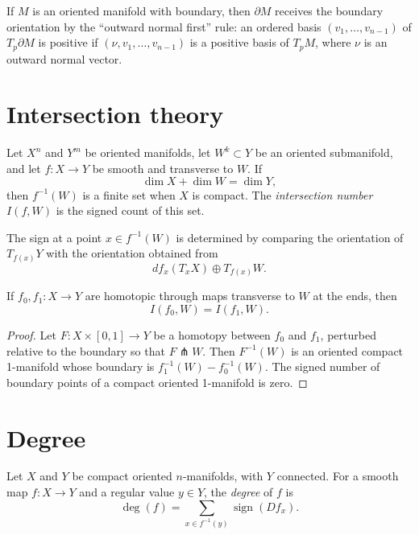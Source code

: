 \noindent
If $M$ is an oriented manifold with boundary,
then $\partial M$ receives the boundary
orientation by the ``outward normal first''
rule: an ordered basis $(v_1,\ldots,v_{n-1})$
of $T_p\partial M$ is positive if
$(\nu,v_1,\ldots,v_{n-1})$ is a positive
basis of $T_pM$, where $\nu$ is an outward
normal vector.

\section{Intersection theory}
\label{section-intersection-theory}

\begin{definition}
\label{definition-intersection-number}
Let $X^n$ and $Y^m$ be oriented manifolds,
let $W^k\subset Y$ be an oriented
submanifold, and let $f:X\to Y$ be smooth and
transverse to $W$.  If
$$
\dim X+\dim W=\dim Y,
$$
then $f^{-1}(W)$ is a finite set when $X$ is
compact.  The {\it intersection number}
$I(f,W)$ is the signed count of this set.
\end{definition}

\noindent
The sign at a point $x\in f^{-1}(W)$ is
determined by comparing the orientation of
$T_{f(x)}Y$ with the orientation obtained
from
$$
df_x(T_xX)\oplus T_{f(x)}W.
$$

\begin{proposition}
\label{proposition-intersection-homotopy}
If $f_0,f_1:X\to Y$ are homotopic through
maps transverse to $W$ at the ends, then
$$
I(f_0,W)=I(f_1,W).
$$
\end{proposition}

\begin{proof}
Let $F:X\times[0,1]\to Y$ be a homotopy
between $f_0$ and $f_1$, perturbed relative
to the boundary so that $F\pitchfork W$.
Then $F^{-1}(W)$ is an oriented compact
1-manifold whose boundary is
$f_1^{-1}(W)-f_0^{-1}(W)$.  The signed number
of boundary points of a compact oriented
1-manifold is zero.
\end{proof}

\section{Degree}
\label{section-degree}

\begin{definition}
\label{definition-degree-map}
Let $X$ and $Y$ be compact oriented
$n$-manifolds, with $Y$ connected.  For a
smooth map $f:X\to Y$ and a regular value
$y\in Y$, the {\it degree} of $f$ is
$$
\deg(f)=\sum_{x\in f^{-1}(y)}\operatorname{sign}
(Df_x).
$$
\end{definition}

